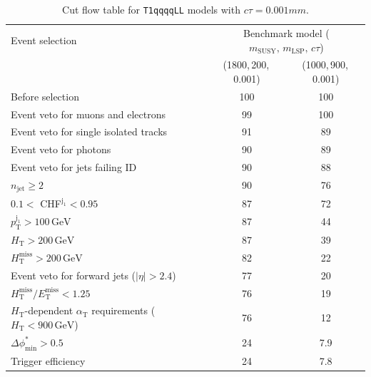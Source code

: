 \clearpage
\begin{table}[!h]
  \caption{Cut flow table for \texttt{T1qqqqLL} models with $c\tau = 0.001\unit{mm}$.} 
  \label{tab:cut_flow_ctau_0p001}
{\scriptsize%
\centering
\begin{tabular}{lcc}
  \hline
  Event selection & \multicolumn{2}{c}{Benchmark model ($m_\mathrm{SUSY},\,m_\mathrm{LSP},\,c\tau$)} \\
  \cline{2-3}
   & (1800,\,200,\,0.001) & (1000,\,900,\,0.001) \\
  \hline
  Before selection & 100\phantom{.1} & 100\phantom{.1} \\
  Event veto for muons and electrons & \phantom{1}99\phantom{.1} & 100\phantom{.1} \\
  Event veto for single isolated tracks & \phantom{1}91\phantom{.1} & \phantom{1}89\phantom{.1}  \\
  Event veto for photons & \phantom{1}90\phantom{.1} & \phantom{1}89\phantom{.1} \\
  Event veto for jets failing ID & \phantom{1}90\phantom{.1} & \phantom{1}88\phantom{.1} \\
   $n_{\mathrm{jet}} \geq 2$ & \phantom{1}90\phantom{.1} & \phantom{1}76\phantom{.1}  \\
   $0.1 <$ CHF$^{\mathrm{j_1}} < 0.95$ & \phantom{1}87\phantom{.1} & \phantom{1}72\phantom{.1} \\
   $p_{\mathrm{T}}^{\mathrm{j_1}} > 100\,\mathrm{GeV}$ & \phantom{1}87\phantom{.1} & \phantom{1}44\phantom{.1} \\
   $H_{\mathrm{T}} > 200\,\mathrm{GeV}$ & \phantom{1}87\phantom{.1} & \phantom{1}39\phantom{.1}  \\
  $H_{\mathrm{T}}^{\mathrm{miss}} > 200\,\mathrm{GeV}$ & \phantom{1}82\phantom{.1} & \phantom{1}22\phantom{.1}  \\
  Event veto for forward jets ($|\eta| > 2.4$) & \phantom{1}77\phantom{.1} & \phantom{1}20\phantom{.1}  \\
  $H_{\mathrm{T}}^{\mathrm{miss}} / E_{\mathrm{T}}^{\mathrm{miss}} < 1.25$ & \phantom{1}76\phantom{.1} & \phantom{1}19\phantom{.1}  \\
  $H_{\mathrm{T}}$-dependent $\alpha_{\mathrm{T}}$ requirements ($H_{\mathrm{T}} < 900\,\mathrm{GeV}$) & \phantom{1}76\phantom{.1} & \phantom{1}12\phantom{.1} \\
  $\Delta\phi^{*}_{\mathrm{min}} > 0.5$ & \phantom{1}24\phantom{.1} & \phantom{10}7.9  \\
  Trigger efficiency & \phantom{1}24\phantom{.1} & \phantom{10}7.8 \\
  \hline
\end{tabular}
}
\end{table}

